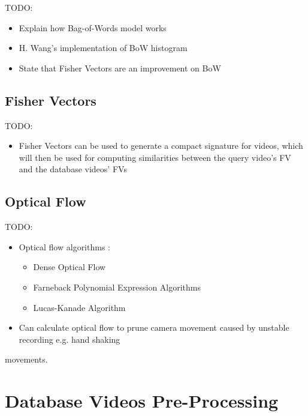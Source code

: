 \documentclass[11pt,openany,a4paper]{article}
\begin{document}
TODO:
\begin{itemize}
    \item Explain how Bag-of-Words model works
    \item H. Wang's implementation of BoW histogram \cite{wang2016actionregonition}
    \item State that Fisher Vectors are an improvement on BoW
\end{itemize}


\subsection{Fisher Vectors}
\label{sec:fisher-vectors}

TODO:
\begin{itemize}
    \item Fisher Vectors can be used to generate a compact signature for videos, which will then be used for computing similarities between the query video's FV and the database videos' FVs \cite{araujo2017i2v}
\end{itemize}


\subsection{Optical Flow}
\label{sec:optical-flow}

TODO:
\begin{itemize}
    \item Optical flow algorithms \cite{bradski2008opencv}:
    \begin{itemize}
        \item Dense Optical Flow
        \item Farneback Polynomial Expression Algorithms
        \item Lucas-Kanade Algorithm
    \end{itemize}
    \item Can calculate optical flow to prune camera movement caused by unstable recording e.g. hand shaking \cite{wang2016actionregonition}
\end{itemize} movements.


\clearpage \section{Database Videos Pre-Processing}
\end{document}
